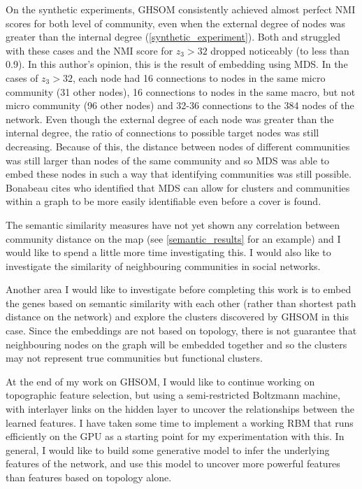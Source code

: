 \documentclass{report}
\begin{document}
	On the synthetic experiments, GHSOM consistently achieved almost perfect NMI scores for both level of community, even when the external degree of nodes was greater than the internal degree (\cref{synthetic_experiment}).
	Both \cite{lancichinetti2009detecting} and \cite{yang2013hierarchical} struggled with these cases and the NMI score for $z_3 > 32$ dropped noticeably (to less than 0.9).
	In this author's opinion, this is the result of embedding using MDS. In the cases of $z_3 > 32$, each node had 16 connections to nodes in the same micro community (31 other nodes), 16 connections to nodes in the same macro, but not micro community (96 other nodes) and 32-36 connections to the 384 nodes of the network. 
	Even though the external degree of each node was greater than the internal degree, the ratio of connections to possible target nodes was still decreasing.
	Because of this, the distance between nodes of different communities was still larger than nodes of the same community and so MDS was able to embed these nodes in such a way that identifying communities was still possible. 
	Bonabeau \cite{bonabeau2002graph} cites \cite{kernighan1970efficient} who identified that MDS can allow for clusters and communities within a graph to be more easily identifiable even before a cover is found. 
	
	The semantic similarity measures have not yet shown any correlation between community distance on the map (see \cref{semantic_results} for an example) and I would like to spend a little more time investigating this. I would also like to investigate the similarity of neighbouring communities in social networks. 
	
	Another area I would like to investigate before completing this work is to embed the genes based on semantic similarity with each other (rather than shortest path distance on the network) and explore the clusters discovered by GHSOM in this case. Since the embeddings are not based on topology, there is not guarantee that neighbouring nodes on the graph will be embedded together and so the clusters may not represent true communities but functional clusters.  
	
	At the end of my work on GHSOM, I would like to continue working on topographic feature selection, but using a semi-restricted Boltzmann machine, with interlayer links on the hidden layer to uncover the relationships between the learned features. I have taken some time to implement a working RBM that runs efficiently on the GPU as a starting point for my experimentation with this. In general, I would like to build some generative model to infer the underlying features of the network, and use this model to uncover more powerful features than features based on topology alone. 
	
	
	
	
\end{document}
